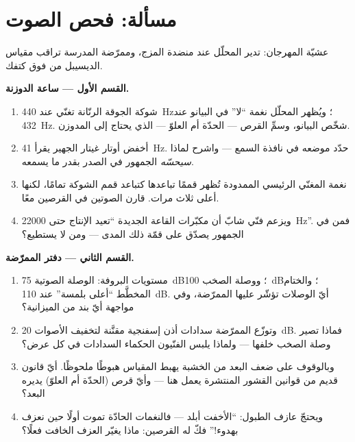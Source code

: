 \section{مسألة: فحص الصوت}

\begin{problem}\label{pb:g8:sound-pitch-loudness:1}
عشيّة المهرجان: تدير المحلّل عند منضدة المزج، وممرّضة المدرسة
تراقب مقياس الديسيبل من فوق كتفك.

\medskip\noindent\textbf{القسم الأول --- ساعة الدوزنة.}
\begin{enumerate}
  \item شوكة الجوقة الرنّانة تغنّي عند \qty{440}{Hz}؛ ويُظهر
        المحلّل نغمة ``لا'' في البيانو عند \qty{432}{Hz}.
        شخّص البيانو، وسمِّ القرص --- الحدّة أم العلوّ ---
        الذي يحتاج إلى المدوزن.
  \item أخفض أوتار غيتار الجهير يقرأ \qty{41}{Hz}. حدّد
        موضعه في نافذة السمع --- واشرح لماذا
        \emph{سيحسّه} الجمهور في الصدر بقدر ما يسمعه.
  \item نغمة المغنّي الرئيسي الممدودة تُظهر قممًا تباعدها
        كتباعد قمم الشوكة تمامًا، لكنها أعلى ثلاث مرات.
        قارن الصوتين في القرصين معًا.
  \item ويزعم فنّي شابّ أن مكبّرات القاعة الجديدة ``تعيد
        الإنتاج حتى \qty{22000}{Hz}''. فمن في الجمهور يصدّق
        على قمّة ذلك المدى --- ومن لا يستطيع؟
\end{enumerate}

\medskip\noindent\textbf{القسم الثاني --- دفتر الممرّضة.}
\begin{enumerate}[resume]
  \item مستويات البروفة: الوصلة الصوتية \qty{75}{dB}؛ ووصلة
        الصخب \qty{100}{dB}؛ والختام المخطَّط ``أعلى بلمسة''
        عند \qty{110}{dB}. أيّ الوصلات تؤشّر عليها
        الممرّضة، وفي مواجهة أيّ بند من الميزانية؟
  \item وتوزّع الممرّضة سدادات أذن إسفنجية مقنَّنة لتخفيف
        الأصوات \qty{20}{dB}. فماذا تصير وصلة الصخب خلفها
        --- ولماذا يلبس الفنّيون الحكماء السدادات في كل
        عرض؟
  \item وبالوقوف على ضعف البعد من الخشبة يهبط المقياس هبوطًا
        ملحوظًا. أيّ قانون قديم من قوانين القشور المنتشرة
        يعمل هنا --- وأيّ قرص (الحدّة أم العلوّ) يديره
        البعد؟
  \item ويحتجّ عازف الطبول: ``الأخفت أبلد --- فالنغمات
        الحادّة تموت أولًا حين نعزف بهدوء!'' فكّ له القرصين:
        ماذا يغيّر العزف الخافت فعلًا؟
\end{enumerate}


\end{problem}
